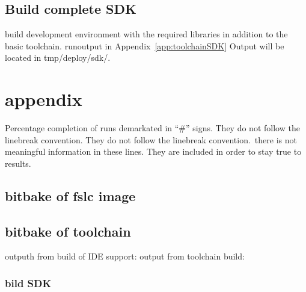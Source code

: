 \documentclass[10pt]{article}
\begin{document}
\subsection{Build complete SDK}
build development environment with the required libraries in addition to the basic toolchain.
runoutput in Appendix~\ref{app:toolchainSDK}
Output will be located in tmp/deploy/sdk/.


\section{appendix}
Percentage completion of runs demarkated in ``\#'' signs. They do not follow the linebreak convention.
They do not follow the linebreak convention.\ there is not meaningful information in these lines. They
are included in order to stay true to results.

\subsection{bitbake of fslc image}
\label{app:GUIImage}

\subsection{bitbake of toolchain}
outputh from build of IDE support:
\label{app:toolChainIDESupport}
output from toolchain build:
\label{app:toolChainBuild}
\subsubsection{bild SDK}
\label{app:toolChainSDK}

%
\end{document}

